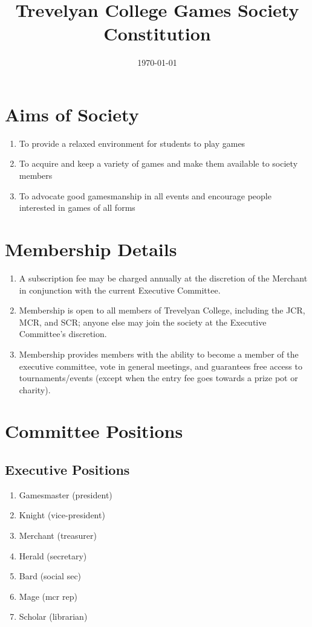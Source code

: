 \documentclass[hidelinks, 12pt, a4paper]{article}
\title{Trevelyan College Games Society Constitution}
\date{\today}
\begin{document}
	\maketitle
	
	\tableofcontents
	\newpage
	
	\section{Aims of Society}
	\begin{enumerate}
		\item To provide a relaxed environment for students to play games
		\item To acquire and keep a variety of games and make them available to society members
		\item To advocate good gamesmanship in all events and encourage people interested in games of all forms
	\end{enumerate}

	\section{Membership Details}
	\begin{enumerate}
		\item A subscription fee may be charged annually at the discretion of the Merchant in conjunction with the current Executive Committee.
		\item Membership is open to all members of Trevelyan College, including the JCR, MCR, and SCR; anyone else may join the society at the Executive Committee's discretion.
		\item Membership provides members with the ability to become a member of the executive committee, vote in general meetings, and guarantees free access to tournaments/events (except when the entry fee goes towards a prize pot or charity).
	\end{enumerate}

	\section{Committee Positions}
	\subsection{Executive Positions}
	\begin{enumerate}
		\item Gamesmaster {\small(president)}
		\item Knight {\small(vice-president)}
		\item Merchant {\small(treasurer)}
		\item Herald {\small(secretary)}
		\item Bard {\small(social sec)}
		\item Mage {\small(mcr rep)}
		\item Scholar {\small(librarian)}
	\end{enumerate}
\end{document}
